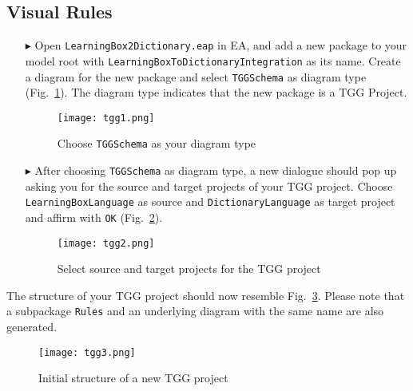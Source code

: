 \newpage
\subsection{Visual Rules}
\visHeader

\begin{enumerate}

\item[$\blacktriangleright$] Open \texttt{LearningBox2Dictionary.eap} in EA, and add a new package to your model root with \texttt{Learning\-Box\-To\-Dictionary\-Integration} as its name. 
Create a diagram for the new package and select \texttt{TGGSchema} as diagram type (Fig.~\ref{fig:tgg_diagram_type}). 
The diagram type indicates that the new package is a TGG Project. 

\begin{figure}[htbp]
\begin{center}
  \texttt{[image: tgg1.png]}
  \caption{Choose \texttt{TGGSchema} as your diagram type}  
  \label{fig:tgg_diagram_type}
\end{center}
\end{figure}

\item[$\blacktriangleright$] After choosing \texttt{TGGSchema} as diagram type, a new dialogue should pop up asking you for the source and target projects of your TGG project. 
Choose \texttt{Learning\-Box\-Language} as source and \texttt{Dictionary\-Language} as target project and affirm with \texttt{OK} (Fig.~\ref{fig:select_source_target}).

\begin{figure}[htbp]
\begin{center}
  \texttt{[image: tgg2.png]}
  \caption{Select source and target projects for the TGG project}  
  \label{fig:select_source_target}
\end{center}
\end{figure}
\end{enumerate}

The structure of your TGG project should now resemble Fig.~\ref{fig:new_tgg_project}.
Please note that a subpackage \texttt{Rules} and an underlying diagram with the same name are also generated.

\begin{figure}[htbp]
\begin{center}
  \texttt{[image: tgg3.png]}
  \caption{Initial structure of a new TGG project}  
  \label{fig:new_tgg_project}
\end{center}
\end{figure}

